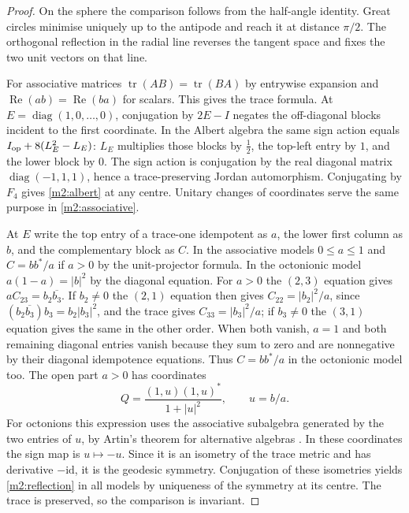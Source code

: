 \documentclass[11pt,reqno]{amsart}
\theoremstyle{definition}
\theoremstyle{remark}
\numberwithin{equation}{section}
\newcommand{\re}{\operatorname{Re}}
\begin{document}
\begin{proof}
On the sphere the comparison follows from the half-angle identity.  Great circles minimise uniquely up to the antipode and reach it at
distance $\pi/2$.  The orthogonal reflection in the radial line reverses the tangent space and fixes the two unit vectors on that line.

For associative matrices $\operatorname{tr}(AB)=\operatorname{tr}(BA)$ by entrywise expansion and $\re(ab)=\re(ba)$ for scalars.  This gives
the trace formula.  At $E=\operatorname{diag}(1,0,\dots,0)$, conjugation by $2E-I$ negates the off-diagonal blocks incident to the first
coordinate.  In the Albert algebra the same sign action equals $I_{\rm op}+8(L_E^2-L_E)$: $L_E$ multiplies those blocks by $\tfrac12$, the
top-left entry by $1$, and the lower block by $0$.  The sign action is conjugation by the real diagonal matrix $\operatorname{diag}(-1,1,1)$,
hence a trace-preserving Jordan automorphism.  Conjugating by $F_4$ gives \eqref{m2:albert} at any centre.  Unitary changes of coordinates
serve the same purpose in \eqref{m2:associative}.

At $E$ write the top entry of a trace-one idempotent as $a$, the lower first column as $b$, and the complementary block as $C$.  In the
associative models $0\le a\le1$ and $C=bb^*/a$ if $a>0$ by the unit-projector formula.  In the octonionic model $a(1-a)=|b|^2$ by the
diagonal equation.  For $a>0$ the $(2,3)$ equation gives $aC_{23}=b_2\overline{b_3}$.  If $b_2\ne0$ the $(2,1)$ equation then gives
$C_{22}=|b_2|^2/a$, since $(b_2\overline{b_3})b_3=b_2|b_3|^2$, and the trace gives $C_{33}=|b_3|^2/a$; if $b_3\ne0$ the $(3,1)$ equation
gives the same in the other order.  When both vanish, $a=1$ and both remaining diagonal entries vanish because they sum to zero and are
nonnegative by their diagonal idempotence equations.  Thus $C=bb^*/a$ in the octonionic model too.  The open part $a>0$ has coordinates
\[
 Q=\frac{(1,u)(1,u)^*}{1+|u|^2},\qquad u=b/a .
\]
For octonions this expression uses the associative subalgebra generated by the two entries of $u$, by Artin's theorem for alternative
algebras \cite[\S1.1]{Baez02}.  In these coordinates the sign map is $u\mapsto-u$.  Since it is an isometry of the trace metric and has
derivative $-\mathrm{id}$, it is the geodesic symmetry.  Conjugation of these isometries yields \eqref{m2:reflection} in all models by
uniqueness of the symmetry at its centre.  The trace is preserved, so the comparison is invariant.


\end{proof}
\end{document}
